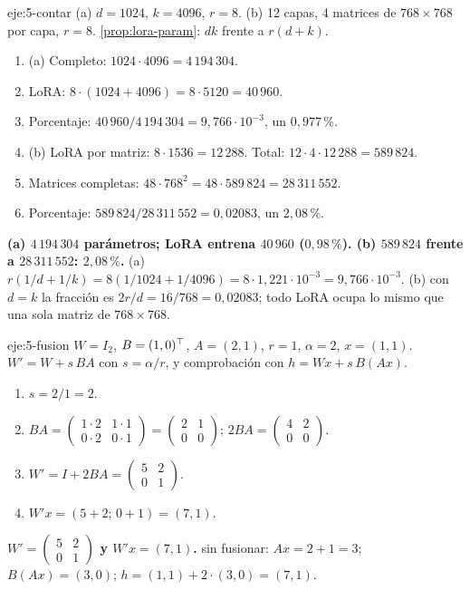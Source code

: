 \begin{solucion}{eje:5-contar}
\datos (a) $d=1024$, $k=4096$, $r=8$. (b) 12 capas, 4 matrices de $768\times 768$ por capa, $r=8$.
\planteamiento \cref{prop:lora-param}: $dk$ frente a $r(d+k)$.
\pasos
\begin{enumerate}[label=\arabic*.]
  \item (a) Completo: $1024\cdot 4096=4\,194\,304$.
  \item LoRA: $8\cdot(1024+4096)=8\cdot 5120=40\,960$.
  \item Porcentaje: $40\,960/4\,194\,304=9{,}766\cdot 10^{-3}$, un $0{,}977\,\%$.
  \item (b) LoRA por matriz: $8\cdot 1536=12\,288$. Total: $12\cdot 4\cdot 12\,288=589\,824$.
  \item Matrices completas: $48\cdot 768^{2}=48\cdot 589\,824=28\,311\,552$.
  \item Porcentaje: $589\,824/28\,311\,552=0{,}02083$, un $2{,}08\,\%$.
\end{enumerate}
\resultado \textbf{(a) $4\,194\,304$ parámetros; LoRA entrena $40\,960$ ($0{,}98\,\%$). (b) $589\,824$ frente a $28\,311\,552$: $2{,}08\,\%$.}
\comprobacion (a) $r(1/d+1/k)=8(1/1024+1/4096)=8\cdot 1{,}221\cdot 10^{-3}=9{,}766\cdot 10^{-3}$. (b) con $d=k$ la fracción es $2r/d=16/768=0{,}02083$; todo LoRA ocupa lo mismo que una sola matriz de $768\times 768$.
\end{solucion}

\begin{solucion}{eje:5-fusion}
\datos $W=I_2$, $B=(1,0)^{\top}$, $A=(2,1)$, $r=1$, $\alpha=2$, $x=(1,1)$.
\planteamiento $W'=W+s\,BA$ con $s=\alpha/r$, y comprobación con $h=Wx+s\,B(Ax)$.
\pasos
\begin{enumerate}[label=\arabic*.]
  \item $s=2/1=2$.
  \item $BA=\begin{pmatrix}1\cdot 2&1\cdot 1\\0\cdot 2&0\cdot 1\end{pmatrix}=\begin{pmatrix}2&1\\0&0\end{pmatrix}$; $2BA=\begin{pmatrix}4&2\\0&0\end{pmatrix}$.
  \item $W'=I+2BA=\begin{pmatrix}5&2\\0&1\end{pmatrix}$.
  \item $W'x=(5+2;\,0+1)=(7,1)$.
\end{enumerate}
\resultado \textbf{$W'=\begin{pmatrix}5&2\\0&1\end{pmatrix}$ y $W'x=(7,1)$.}
\comprobacion sin fusionar: $Ax=2+1=3$; $B(Ax)=(3,0)$; $h=(1,1)+2\cdot(3,0)=(7,1)$.
\end{solucion}

